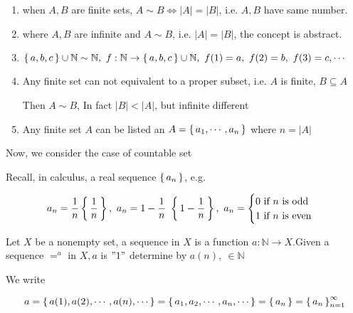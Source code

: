 \begin{rmk*} $ $
	\begin{enumerate}
		\item when $A,B$ are finite sets, $A \sim B \Leftrightarrow |A| = |B|$, i.e. $A,B$ have same number.
		\item where $A,B$ are infinite and $A \sim B$, i.e. $|A| = |B|$, the concept is abstract.
		\item $\left\{ \,a,b,c \,\right\} \cup \mathbb N \sim \mathbb N,~f:\mathbb N \rightarrow \left\{ \,a,b,c \,\right\} \cup \mathbb N,~f(1) = a,~f(2) = b,~f(3) = c,\cdots$
		\item Any finite set can not equivalent to a proper subset, i.e. $A$ is finite, $B \subseteq A$
		
		Then $A \sim B$, In fact $|B| < |A|$, but infinite different
		\item Any finite set $A$ can be listed an $A = \left\{ \,a_1,\cdots,a_n \,\right\}$ where $n = |A|$
	\end{enumerate}
\end{rmk*}

Now, we consider the case of countable set

\begin{tcolorbox}
	Recall, in calculus, a real sequence $\left\{ \,a_n \,\right\}$, e.g.
	
	$$a_n = \frac{1}{n}\left\{ \,\frac{1}{n} \,\right\},~a_n = 1 - \frac{1}{n}~\left\{ \,1-\frac{1}{n} \,\right\},~a_n=\begin{cases}
		0 \text{ if } n \text{ is odd}\\1 \text{ if } n \text{ is even}
	\end{cases}$$
\end{tcolorbox}

\begin{defn}
	Let $X$ be a nonempty set, a sequence in $X$ is a function $a:\mathbb N \rightarrow X$.Given a sequence $=^{a}$ in $X, a$ is $"1"$ determine by $a(n),~ \in \mathbb N$
	
	We write
	
	$$a = \left\{ \,a(1),a(2),\cdots,a(n),\cdots \,\right\} = \left\{ \,a_1,a_2,\cdots,a_n,\cdots \,\right\} = \left\{ \,a_n \,\right\} = \left\{ \,a_n \,\right\}^{\infty}_{n = 1}$$ 

\end{defn}


